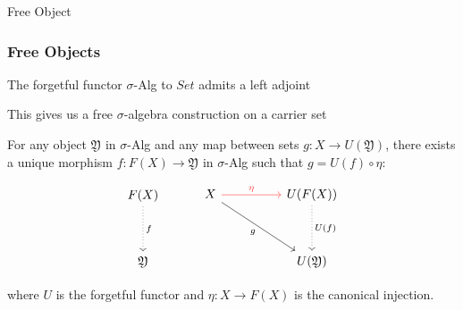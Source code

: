 \documentclass[9pt]{beamer}
\begin{document}
\begin{frame}{Free Object}
\frametitle{Free Objects}

The forgetful functor $\sigma$-Alg to $Set$ admits a left adjoint

This gives us a free $\sigma$-algebra construction on a carrier set

\begin{dblock}
For any object \( \mathfrak{Y} \) in $\sigma$-Alg and any map between sets \( g : X \to U(\mathfrak{Y}) \),
there exists a unique morphism \( f : F(X) \to \mathfrak{Y} \) in $\sigma$-Alg such that \( g = U(f) \circ \eta \):

\[
\begin{tikzcd}[ampersand replacement=\&]
	F(X) \\
	\\
	\mathfrak{Y}
	\arrow["f", dotted, from=1-1, to=3-1]
\end{tikzcd}
\hspace{1cm}
\begin{tikzcd}[ampersand replacement=\&]
	X \&\& {U(F(X))} \\
	\\
	\&\& {U(\mathfrak{Y})}
	\arrow["\eta", color={rgb,255:red,255;green,54;blue,51}, from=1-1, to=1-3]
	\arrow["g"', from=1-1, to=3-3]
	\arrow["{U(f)}", dotted, from=1-3, to=3-3]
\end{tikzcd}\]

where $U$ is the forgetful functor and $\eta : X \rightarrow F(X)$ is the canonical injection.
\end{dblock}

\end{frame}
\end{document}

